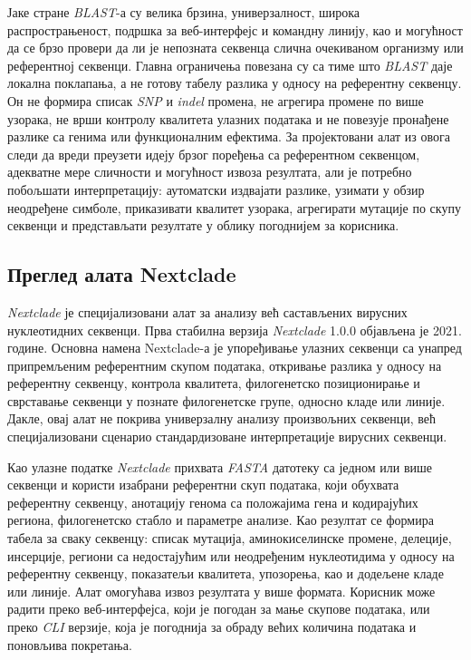 \documentclass[12pt,oneside]{memoir}
\begin{document}
Јаке стране \textit{BLAST}-а су велика брзина, универзалност, широка распрострањеност, подршка за веб-интерфејс и командну линију, као и могућност да се брзо провери да ли је непозната секвенца слична очекиваном организму или референтној секвенци. Главна ограничења повезана су са тиме што \textit{BLAST} даје локална поклапања, а не готову табелу разлика у односу на референтну секвенцу. Он не формира списак \textit{SNP} и \textit{indel} промена, не агрегира промене по више узорака, не врши контролу квалитета улазних података и не повезује пронађене разлике са генима или функционалним ефектима. За пројектовани алат из овога следи да вреди преузети идеју брзог поређења са референтном секвенцом, адекватне мере сличности и могућност извоза резултата, али је потребно побољшати интерпретацију: аутоматски издвајати разлике, узимати у обзир неодређене симболе, приказивати квалитет узорака, агрегирати мутације по скупу секвенци и представљати резултате у облику погоднијем за корисника.


\subsection{Преглед алата Nextclade}
\textit{Nextclade} је специјализовани алат за анализу већ састављених вирусних нуклеотидних секвенци. Прва стабилна верзија \textit{Nextclade} 1.0.0 објављена је 2021. године\cite{Aksamentov2021Nextclade}. Основна намена Nextclade-а је упоређивање улазних секвенци са унапред припремљеним референтним скупом података, откривање разлика у односу на референтну секвенцу, контрола квалитета, филогенетско позиционирање и сврставање секвенци у познате филогенетске групе, односно кладе или линије. Дакле, овај алат не покрива универзалну анализу произвољних секвенци, већ специјализовани сценарио стандардизоване интерпретације вирусних секвенци.

Као улазне податке \textit{Nextclade} прихвата \textit{FASTA} датотеку са једном или више секвенци и користи изабрани референтни скуп података, који обухвата референтну секвенцу, анотацију генома са положајима гена и кодирајућих региона, филогенетско стабло и параметре анализе. Као резултат се формира табела за сваку секвенцу: списак мутација, аминокиселинске промене, делеције, инсерције, региони са недостајућим или неодређеним нуклеотидима у односу на референтну секвенцу, показатељи квалитета, упозорења, као и додељене кладе или линије. Алат омогућава извоз резултата у више формата. Корисник може радити преко веб-интерфејса, који је погодан за мање скупове података, или преко \textit{CLI} верзије, која је погоднија за обраду већих количина података и поновљива покретања.
\end{document}
